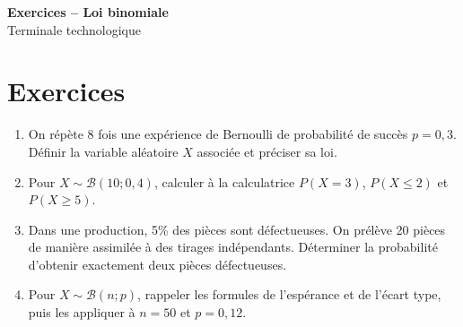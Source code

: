 \documentclass[french,11pt]{book}
\begin{document}
\begin{center}
{\Large \textbf{Exercices -- Loi binomiale}}\\[2mm]
Terminale technologique
\end{center}

\section*{Exercices}
\begin{enumerate}
  \item On répète 8 fois une expérience de Bernoulli de probabilité de succès $p=0,3$. Définir la variable aléatoire $X$ associée et préciser sa loi.
  \item Pour $X\sim\mathcal{B}(10;0,4)$, calculer à la calculatrice $P(X=3)$, $P(X\leq 2)$ et $P(X\geq 5)$.
  \item Dans une production, 5\% des pièces sont défectueuses. On prélève 20 pièces de manière assimilée à des tirages indépendants. Déterminer la probabilité d'obtenir exactement deux pièces défectueuses.
  \item Pour $X\sim\mathcal{B}(n;p)$, rappeler les formules de l'espérance et de l'écart type, puis les appliquer à $n=50$ et $p=0,12$.
\end{enumerate}
\end{document}
